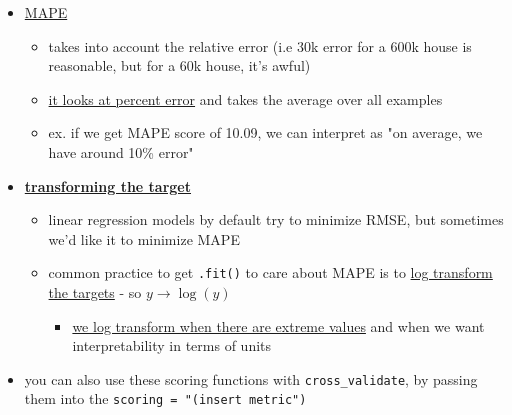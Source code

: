\documentclass[10.5pt,a4paper, fleqn, dvipsnames]{article}
\begin{document}
\begin{itemize}
\begin{itemize}
    \end{itemize}
    \item \ul{MAPE}
    \begin{itemize}
        \item takes into account the relative error (i.e 30k error for a 600k house is reasonable, but for a 60k house, it's awful)
        \item \ul{it looks at percent error} and takes the average over all examples
        \item ex. if we get MAPE score of 10.09, we can interpret as "on average, we have around 10\% error"
    \end{itemize}
    \item \textbf{\ul{transforming the target}}
    \begin{itemize}
        \item linear regression models by default try to minimize RMSE, but sometimes we'd like it to minimize MAPE
        \item common practice to get \lstinline{.fit()} to care about MAPE is to \ul{log transform the targets} - so $y \rightarrow \log(y)$
        \begin{itemize}
            \item \ul{we log transform when there are extreme values} and when we want interpretability in terms of units
        \end{itemize}
    \end{itemize}
    \item you can also use these scoring functions with \lstinline{cross_validate}, by passing them into the \lstinline{scoring = "(insert metric")}
\end{itemize}
\end{document}
